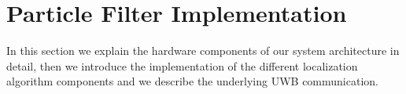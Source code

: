 
\chapter{Particle Filter Implementation} %

\label{Chapter5} %
In this section we explain the hardware components of our system architecture in detail, then we introduce the implementation of the different localization algorithm components and we describe the underlying UWB communication.


